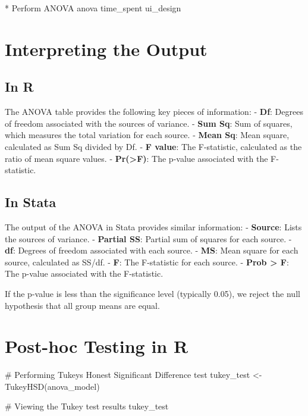 \documentclass[
  letterpaper,
  DIV=11,
  numbers=noendperiod]{scrreprt}
\newenvironment{Shaded}{\begin{snugshade}}{\end{snugshade}}
\newcommand{\CommentTok}[1]{\textcolor[rgb]{0.37,0.37,0.37}{#1}}
\newcommand{\FunctionTok}[1]{\textcolor[rgb]{0.28,0.35,0.67}{#1}}
\newcommand{\NormalTok}[1]{\textcolor[rgb]{0.00,0.23,0.31}{#1}}
\newcommand{\OtherTok}[1]{\textcolor[rgb]{0.00,0.23,0.31}{#1}}
\begin{document}
\begin{Shaded}
\begin{Highlighting}[]
\NormalTok{* Perform ANOVA}
\NormalTok{anova time\_spent ui\_design}
\end{Highlighting}
\end{Shaded}

\section{Interpreting the Output}\label{interpreting-the-output}

\subsection{In R}\label{in-r-3}

The ANOVA table provides the following key pieces of information: -
\textbf{Df}: Degrees of freedom associated with the sources of variance.
- \textbf{Sum Sq}: Sum of squares, which measures the total variation
for each source. - \textbf{Mean Sq}: Mean square, calculated as Sum Sq
divided by Df. - \textbf{F value}: The F-statistic, calculated as the
ratio of mean square values. - \textbf{Pr(\textgreater F)}: The p-value
associated with the F-statistic.

\subsection{In Stata}\label{in-stata-3}

The output of the ANOVA in Stata provides similar information: -
\textbf{Source}: Lists the sources of variance. - \textbf{Partial SS}:
Partial sum of squares for each source. - \textbf{df}: Degrees of
freedom associated with each source. - \textbf{MS}: Mean square for each
source, calculated as SS/df. - \textbf{F}: The F-statistic for each
source. - \textbf{Prob \textgreater{} F}: The p-value associated with
the F-statistic.

If the p-value is less than the significance level (typically 0.05), we
reject the null hypothesis that all group means are equal.

\section{Post-hoc Testing in R}\label{post-hoc-testing-in-r}

\begin{Shaded}
\begin{Highlighting}[]
\CommentTok{\# Performing Tukey\textquotesingle{}s Honest Significant Difference test}
\NormalTok{tukey\_test }\OtherTok{\textless{}{-}} \FunctionTok{TukeyHSD}\NormalTok{(anova\_model)}

\CommentTok{\# Viewing the Tukey test results}
\NormalTok{tukey\_test}
\end{Highlighting}
\end{Shaded}
\end{document}
